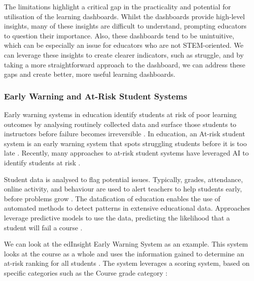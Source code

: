 The limitations highlight a critical gap in the practicality and potential for utilisation of the learning dashboards. Whilst the dashboards provide high-level insights, many of these insights are difficult to understand, prompting educators to question their importance. Also, these dashboards tend to be unintuitive, which can be especially an issue for educators who are not STEM-oriented. We can leverage these insights to create clearer indicators, such as struggle, and by taking a more straightforward approach to the dashboard, we can address these gaps and create better, more useful learning dashboards.


\subsubsection{Early Warning and At-Risk Student Systems}

Early warning systems in education identify students at risk of poor learning outcomes by analysing routinely collected data and surface those students to instructors before failure becomes irreversible \cite{macfadyenMiningLMSData2010}.
In education, an At-risk student system is an early warning system that spots struggling students before it is too late \cite{baeres_2020_an}. 
Recently, many approaches to at-risk student systems have leveraged AI to identify students at risk \cite{baeres_2020_an}.


Student data is analysed to flag potential issues. Typically, grades, attendance, online activity, and behaviour are used to alert teachers to help students early, before problems grow \cite{baeres_2020_an}. The datafication of education enables the use of automated methods to detect patterns in extensive educational data. Approaches leverage predictive models to use the data, predicting the likelihood that a student will fail a course \cite{baeres_2020_an}.

We can look at the edInsight Early Warning System as an example. This system looks at the course as a whole and uses the information gained to determine an at-risk ranking for all students \cite{a2020_atrisk}. The system leverages a scoring system, based on specific categories such as the Course grade category \cite{a2020_atrisk}:

